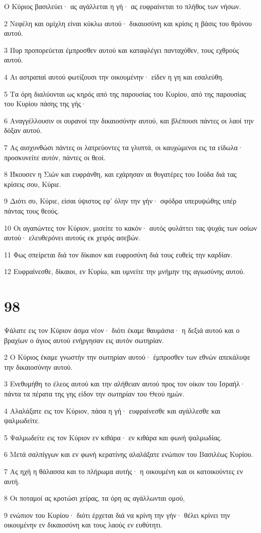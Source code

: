 \par Ο Κύριος βασιλεύει· ας αγάλλεται η γή· ας ευφραίνεται το πλήθος των νήσων.
\par 2 Νεφέλη και ομίχλη είναι κύκλω αυτού· δικαιοσύνη και κρίσις η βάσις του θρόνου αυτού.
\par 3 Πυρ προπορεύεται έμπροσθεν αυτού και καταφλέγει πανταχόθεν, τους εχθρούς αυτού.
\par 4 Αι αστραπαί αυτού φωτίζουσι την οικουμένην· είδεν η γη και εσαλεύθη.
\par 5 Τα όρη διαλύονται ως κηρός από της παρουσίας του Κυρίου, από της παρουσίας του Κυρίου πάσης της γής·
\par 6 Αναγγέλλουσιν οι ουρανοί την δικαιοσύνην αυτού, και βλέπουσι πάντες οι λαοί την δόξαν αυτού.
\par 7 Ας αισχυνθώσι πάντες οι λατρεύοντες τα γλυπτά, οι καυχώμενοι εις τα είδωλα· προσκυνείτε αυτόν, πάντες οι θεοί.
\par 8 Ήκουσεν η Σιών και ευφράνθη, και εχάρησαν αι θυγατέρες του Ιούδα διά τας κρίσεις σου, Κύριε.
\par 9 Διότι συ, Κύριε, είσαι ύψιστος εφ' όλην την γήν· σφόδρα υπερυψώθης υπέρ πάντας τους θεούς.
\par 10 Οι αγαπώντες τον Κύριον, μισείτε το κακόν· αυτός φυλάττει τας ψυχάς των οσίων αυτού· ελευθερόνει αυτούς εκ χειρός ασεβών.
\par 11 Φως σπείρεται διά τον δίκαιον και ευφροσύνη διά τους ευθείς την καρδίαν.
\par 12 Ευφραίνεσθε, δίκαιοι, εν Κυρίω, και υμνείτε την μνήμην της αγιωσύνης αυτού.

\chapter{98}

\par Ψάλατε εις τον Κύριον άσμα νέον· διότι έκαμε θαυμάσια· η δεξιά αυτού και ο βραχίων ο άγιος αυτού ενήργησαν εις αυτόν σωτηρίαν.
\par 2 Ο Κύριος έκαμε γνωστήν την σωτηρίαν αυτού· έμπροσθεν των εθνών απεκάλυψε την δικαιοσύνην αυτού.
\par 3 Ενεθυμήθη το έλεος αυτού και την αλήθειαν αυτού προς τον οίκον του Ισραήλ· πάντα τα πέρατα της γης είδον την σωτηρίαν του Θεού ημών.
\par 4 Αλαλάξατε εις τον Κύριον, πάσα η γή· ευφραίνεσθε και αγάλλεσθε και ψαλμωδείτε.
\par 5 Ψαλμωδείτε εις τον Κύριον εν κιθάρα· εν κιθάρα και φωνή ψαλμωδίας.
\par 6 Μετά σαλπίγγων και εν φωνή κερατίνης αλαλάξατε ενώπιον του Βασιλέως Κυρίου.
\par 7 Ας ηχή η θάλασσα και το πλήρωμα αυτής· η οικουμένη και οι κατοικούντες εν αυτή.
\par 8 Οι ποταμοί ας κροτώσι χείρας, τα όρη ας αγάλλωνται ομού,
\par 9 ενώπιον του Κυρίου· διότι έρχεται διά να κρίνη την γήν· θέλει κρίνει την οικουμένην εν δικαιοσύνη και τους λαούς εν ευθύτητι.


